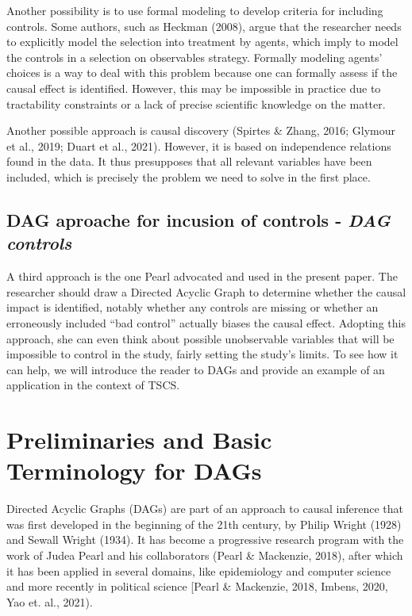 \documentclass[
  super,
  preprint,
  3p]{elsarticle}
\begin{document}
Another possibility is to use formal modeling to develop criteria for
including controls. Some authors, such as Heckman (2008), argue that the
researcher needs to explicitly model the selection into treatment by
agents, which imply to model the controls in a selection on observables
strategy. Formally modeling agents' choices is a way to deal with this
problem because one can formally assess if the causal effect is
identified. However, this may be impossible in practice due to
tractability constraints or a lack of precise scientific knowledge on
the matter.

Another possible approach is causal discovery (Spirtes \& Zhang, 2016;
Glymour et al., 2019; Duart et al., 2021). However, it is based on
independence relations found in the data. It thus presupposes that all
relevant variables have been included, which is precisely the problem we
need to solve in the first place.

\hypertarget{dag-aproache-for-incusion-of-controls---dag-controls}{%
\subsection{\texorpdfstring{DAG aproache for incusion of controls -
\emph{DAG
controls}}{DAG aproache for incusion of controls - DAG controls}}\label{dag-aproache-for-incusion-of-controls---dag-controls}}

A third approach is the one Pearl advocated and used in the present
paper. The researcher should draw a Directed Acyclic Graph to determine
whether the causal impact is identified, notably whether any controls
are missing or whether an erroneously included ``bad control'' actually
biases the causal effect. Adopting this approach, she can even think
about possible unobservable variables that will be impossible to control
in the study, fairly setting the study's limits. To see how it can help,
we will introduce the reader to DAGs and provide an example of an
application in the context of TSCS.

\hypertarget{preliminaries-and-basic-terminology-for-dags}{%
\section{Preliminaries and Basic Terminology for
DAGs}\label{preliminaries-and-basic-terminology-for-dags}}

Directed Acyclic Graphs (DAGs) are part of an approach to causal
inference that was first developed in the beginning of the 21th century,
by Philip Wright (1928) and Sewall Wright (1934). It has become a
progressive research program with the work of Judea Pearl and his
collaborators (Pearl \& Mackenzie, 2018), after which it has been
applied in several domains, like epidemiology and computer science and
more recently in political science {[}Pearl \& Mackenzie, 2018, Imbens,
2020, Yao et. al., 2021).
\end{document}
